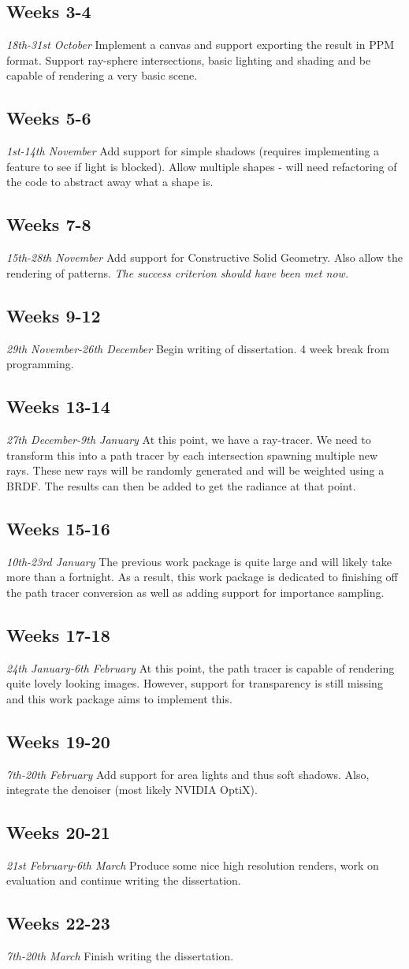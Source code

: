 \documentclass[12pt, a4paper]{article}
\newcommand{\newtime}[3]{
    \subsection*{#1}
    \vspace{-\baselineskip}
    \emph{#2}
    \vspace{\baselineskip}
    \newline
    #3
}
\begin{document}
    \newtime{Weeks 3-4}{18th-31st October}{Implement a canvas and support exporting the result in PPM format. Support ray-sphere intersections, basic lighting and shading and be capable of rendering a very basic scene.}

    \newtime{Weeks 5-6}{1st-14th November}{Add support for simple shadows (requires implementing a feature to see if light is blocked). Allow multiple shapes - will need refactoring of the code to abstract away what a shape is.}

    \newtime{Weeks 7-8}{15th-28th November}{Add support for Constructive Solid Geometry. Also allow the rendering of patterns. \emph{The success criterion should have been met now.}}

    \newtime{Weeks 9-12}{29th November-26th December}{Begin writing of dissertation. 4 week break from programming.}

    \newtime{Weeks 13-14}{27th December-9th January}{At this point, we have a ray-tracer. We need to transform this into a path tracer by each intersection spawning multiple new rays. These new rays will be randomly generated and will be weighted using a BRDF. The results can then be added to get the radiance at that point.}

    \newtime{Weeks 15-16}{10th-23rd January}{The previous work package is quite large and will likely take more than a fortnight. As a result, this work package is dedicated to finishing off the path tracer conversion as well as adding support for importance sampling.}

    \newtime{Weeks 17-18}{24th January-6th February}{At this point, the path tracer is capable of rendering quite lovely looking images. However, support for transparency is still missing and this work package aims to implement this.}

    \newtime{Weeks 19-20}{7th-20th February}{Add support for area lights and thus soft shadows. Also, integrate the denoiser (most likely NVIDIA OptiX).}

    \newtime{Weeks 20-21}{21st February-6th March}{Produce some nice high resolution renders, work on evaluation and continue writing the dissertation.}

    \newtime{Weeks 22-23}{7th-20th March}{Finish writing the dissertation.}
\end{document}
